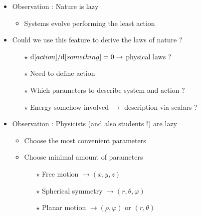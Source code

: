 \begin{itemize}
\item Observation : Nature is lazy
\begin{itemize}
\item Systems evolve performing the least action
\end{itemize}
\item Could we use this feature to derive the laws of nature ?
\begin{itemize}
\item[$\star$] ${\rm d}[action]/{\rm d}[something]=0 \rightarrow$ physical laws ?
\item[$\star$] Need to define {\blue action}
\item[$\star$] Which parameters to describe system and action ?
\item[$\star$] Energy somehow involved $\rightarrow$ description via scalars ?
\end{itemize}
\item Observation : Physicists (and also students !) are lazy
\begin{itemize}
\item Choose the most convenient parameters
\item Choose minimal amount of parameters
\begin{itemize}
\item[$\star$] Free motion $\rightarrow (x,y,z)$
\item[$\star$] Spherical symmetry $\rightarrow (r,\theta,\varphi)$
\item[$\star$] Planar motion $\rightarrow (\rho,\varphi)$ or $(r,\theta)$
\end{itemize}
\end{itemize}
\end{itemize}

